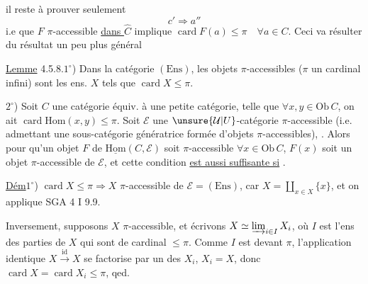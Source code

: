 il reste à prouver seulement
\[
c'\Rightarrow a''
\]
i.e que $F$ $\pi$-accessible \uline{dans $\widehat C$} implique $\operatorname{card}F(a)\leq\pi\quad\forall a\in C$. Ceci va résulter du résultat un peu plus général

\uline{Lemme} 4.5.8.\quad $1^\circ$) Dans la catégorie  $(\mathrm{Ens})$, les objets $\pi$-accessibles ($\pi$ un cardinal infini) sont les ens. $X$ tels que $\operatorname{card}X\leq\pi$.

$2^\circ$) Soit $C$ une catégorie équiv. à une petite catégorie, telle que $\forall x,y\in\mathrm{Ob}\,C$, on ait $\operatorname{card}\mathrm{Hom}(x,y)\leq\pi$. Soit $\mathscr E$ 
une $\unsure{\mathcal U|U}$-catégorie   $\pi$-accessible (i.e. admettant une sous-catégorie génératrice formée d'objets $\pi$-accessibles),  . Alors pour qu'un objet $F$ de $\underline{\mathrm{Hom}}(C,\mathscr E)$ soit $\pi$-accessible   $\forall x\in\mathrm{Ob}\,C$, $F(x)$ soit un objet $\pi$-accessible de $\mathscr E$, et cette condition \uline{est aussi suffisante si}  .

\uline{Dém}\quad $1^\circ$) $\operatorname{card}X\leq\pi\Rightarrow X$ $\pi$-accessible de $\mathscr E=(\mathrm{Ens})$, car $X=\coprod_{x\in X}\{x\}$, et on applique SGA 4 I 9.9.

Inversement, supposons $X$ $\pi$-accessible,  et écrivons $X\simeq\varinjlim_{i\in I}X_i$, où $I$ est l'ens des parties de $X$ qui sont de cardinal $\leq\pi$. Comme $I$ est  devant $\pi$, l'application identique $X\xrightarrow{\mathrm{id}}X$ se factorise par un des $X_i$,  $X_i=X$, donc $\operatorname{card}X=\operatorname{card}X_i\leq\pi$, qed.

